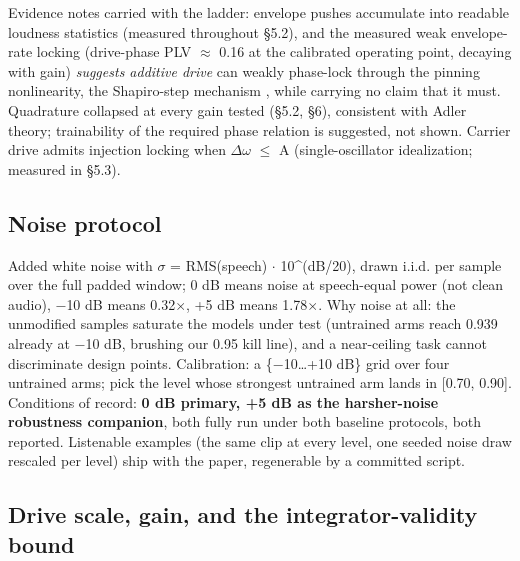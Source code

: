 \documentclass{article}
\begin{document}
Evidence notes carried with the ladder: envelope pushes accumulate into
readable loudness statistics (measured throughout §5.2), and the
measured weak envelope-rate locking (drive-phase PLV
\ensuremath{\approx} 0.16 at the calibrated operating point, decaying
with gain) \emph{suggests additive drive} can weakly phase-lock through
the pinning nonlinearity, the Shapiro-step mechanism
\citep{pikovsky2001}, while carrying no claim that it must. Quadrature
collapsed at every gain tested (§5.2, §6), consistent with Adler theory;
trainability of the required phase relation is suggested, not shown.
Carrier drive admits injection locking when
\textbar{}\ensuremath{\Delta\omega}\textbar{} \ensuremath{\leq} A
(single-oscillator idealization; measured in §5.3).

\subsection{Noise protocol}\label{noise-protocol}

Added white noise with \ensuremath{\sigma} = RMS(speech)
\ensuremath{\cdot} 10\^{}(dB/20), drawn i.i.d. per sample over the full
padded window; 0 dB means noise at speech-equal power (not clean audio),
\ensuremath{-}10 dB means 0.32\ensuremath{\times}, +5 dB means
1.78\ensuremath{\times}. Why noise at all: the unmodified samples
saturate the models under test (untrained arms reach 0.939 already at
\ensuremath{-}10 dB, brushing our 0.95 kill line), and a near-ceiling
task cannot discriminate design points. Calibration: a
\{\ensuremath{-}10\ldots+10 dB\} grid over four untrained arms; pick the
level whose strongest untrained arm lands in {[}0.70, 0.90{]}.
Conditions of record: \textbf{0 dB primary, +5 dB as the harsher-noise
robustness companion}, both fully run under both baseline protocols,
both reported. Listenable examples (the same clip at every level, one
seeded noise draw rescaled per level) ship with the paper, regenerable
by a committed script.

\subsection{Drive scale, gain, and the integrator-validity
bound}\label{drive-scale-gain-and-the-integrator-validity-bound}
\end{document}
